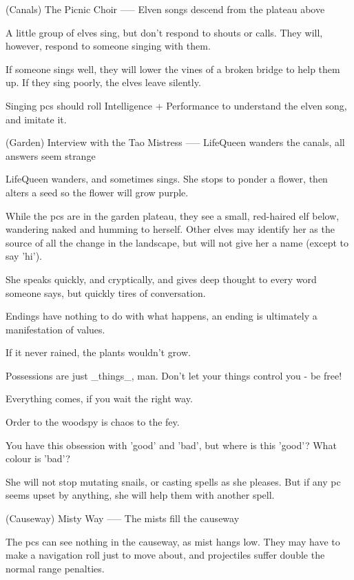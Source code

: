 (Canals) The Picnic Choir
-----
{Elven songs descend from the plateau above}

A little group of elves sing, but don't respond to shouts or calls.
They will, however, respond to someone singing with them.

If someone sings well, they will lower the vines of a broken bridge to help them up.
If they sing poorly, the elves leave silently.

Singing \glspl{pc} should roll Intelligence + Performance to understand the elven song, and imitate it.

(Garden) Interview with the Tao Mistress
-----
{LifeQueen wanders the canals, all answers seem strange}

LifeQueen wanders, and sometimes sings.
She stops to ponder a flower, then alters a seed so the flower will grow purple.

While the \glspl{pc} are in the garden plateau, they see a small, red-haired elf below, wandering naked and humming to herself.
Other elves may identify her as the source of all the change in the landscape, but will not give her a name (except to say 'hi').

She speaks quickly, and cryptically, and gives deep thought to every word someone says, but quickly tires of conversation.


\begin{speechtext}
  Endings have nothing to do with what happens, an ending is ultimately a manifestation of values.

  If it never rained, the plants wouldn't grow.

  Possessions are just _things_, man.  Don't let your things control you - be free!

  Everything comes, if you wait the right way.

  Order to the woodspy is chaos to the fey.

  You have this obsession with 'good' and 'bad', but where is this 'good'? What colour is 'bad'?

\end{speechtext}

She will not stop mutating snails, or casting spells as she pleases.
But if any \gls{pc} seems upset by anything, she will help them with another spell.

(Causeway) Misty Way
-----
{The mists fill the causeway}

The \glspl{pc} can see nothing in the causeway, as mist hangs low.
They may have to make a navigation roll just to move about, and projectiles suffer double the normal range penalties.


